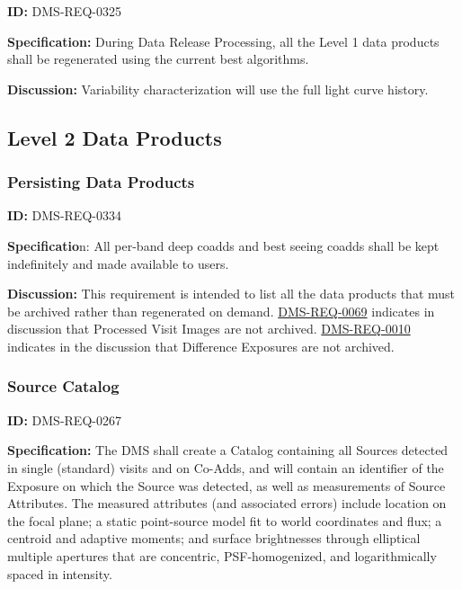 \documentclass[SE,toc,lsstdraft]{lsstdoc}
\begin{document}
\label{DMS-REQ-0325}
\textbf{ID:} DMS-REQ-0325

\textbf{Specification:} During Data Release Processing, all the Level 1 data products shall be regenerated using the current best algorithms.

\textbf{Discussion:} Variability characterization will use the full light curve history.




\subsection{Level 2 Data Products}





\subsubsection{Persisting Data Products}

\label{DMS-REQ-0334}
\textbf{ID:} DMS-REQ-0334



\textbf{Specificatio}n: All per-band deep coadds and best seeing coadds shall be kept indefinitely and made available to users.

\textbf{Discussion:} This requirement is intended to list all the data products that must be archived rather than regenerated on demand. \hyperref[DMS-REQ-0069]{DMS-REQ-0069} indicates in discussion that Processed Visit Images are not archived. \hyperref[DMS-REQ-0010]{DMS-REQ-0010} indicates in the discussion that Difference Exposures are not archived.




\subsubsection{Source Catalog}

\label{DMS-REQ-0267}
\textbf{ID:} DMS-REQ-0267

\textbf{Specification:} The DMS shall create a Catalog containing all Sources detected in single (standard) visits and on Co-Adds, and will contain an identifier of the Exposure on which the Source was detected, as well as measurements of Source Attributes. The measured attributes (and associated errors) include location on the focal plane; a static point-source model fit to world coordinates and flux; a centroid and adaptive moments; and surface brightnesses through elliptical multiple apertures that are concentric, PSF-homogenized, and logarithmically spaced in intensity.
\end{document}
